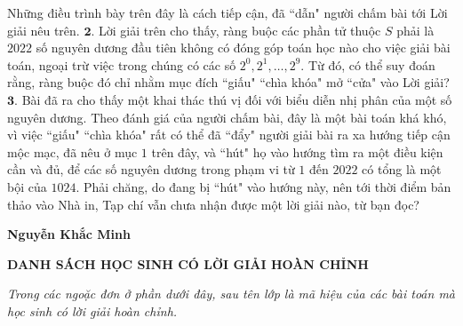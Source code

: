 \begin{multicols}{2}
	\vskip 0.05cm
	Những điều trình bày trên đây là cách tiếp cận, đã ``dẫn" người chấm bài tới Lời giải nêu trên.
	\vskip 0.05cm
	$\pmb{2.}$ Lời giải trên cho thấy, ràng buộc các phần tử thuộc $S$ phải là $2022$ số nguyên dương đầu tiên không có đóng góp toán học nào cho việc giải bài toán, ngoại trừ việc trong chúng có các số  $2^0, 2^1, \ldots, 2^9$. Từ đó, có thể suy đoán rằng, ràng buộc đó chỉ nhằm mục đích ``giấu" ``chìa khóa" mở ``cửa" vào Lời giải?
	\vskip 0.05cm
	$\pmb{3.}$ Bài đã ra cho thấy một khai thác thú vị đối với biểu diễn nhị phân của một số nguyên dương. Theo đánh giá của người chấm bài, đây là một bài toán khá khó, vì việc ``giấu" ``chìa khóa" rất có thể đã ``đẩy" người giải bài ra xa hướng tiếp cận mộc mạc, đã nêu ở mục $1$ trên đây, và ``hút" họ vào hướng tìm ra một điều kiện cần và đủ, để các số nguyên dương trong phạm vi từ $1$ đến $2022$ có tổng là một bội của $1024$. Phải chăng, do đang bị ``hút" vào hướng này, nên tới thời điểm bản thảo vào Nhà in, Tạp chí vẫn chưa nhận được một lời giải nào, từ bạn đọc?
	\begin{flushright}
		\textbf{\color{thachthuctoanhoc}Nguyễn Khắc Minh}
	\end{flushright}
\end{multicols}
\centerline{\textbf{\color{thachthuctoanhoc}DANH SÁCH HỌC SINH CÓ LỜI GIẢI HOÀN CHỈNH}}
\vskip 0.2cm
\textit{Trong các ngoặc đơn ở phần dưới đây, sau tên lớp là mã hiệu của các bài toán mà học sinh có lời giải hoàn chỉnh.}

